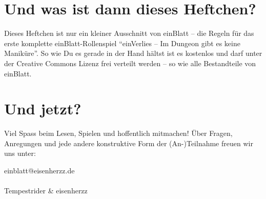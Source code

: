 \section {Und was ist dann dieses Heftchen?}
Dieses Heftchen ist nur ein kleiner Ausschnitt von einBlatt -- die Regeln für das erste komplette einBlatt-Rollenspiel "`einVerlies -- Im Dungeon gibt es keine Maniküre"'. So wie Du es gerade in der Hand hältst ist es kostenlos und darf unter der Creative Commons Lizenz frei verteilt werden -- so wie alle Bestandteile von einBlatt. 

\section {Und jetzt?}
Viel Spass beim Lesen, Spielen und hoffentlich mitmachen! Über Fragen, Anregungen und jede andere konstruktive Form der (An-)Teilnahme freuen wir uns unter:

\Letter einblatt@eisenherzz.de
\\
\\
Tempestrider \& eisenherzz

